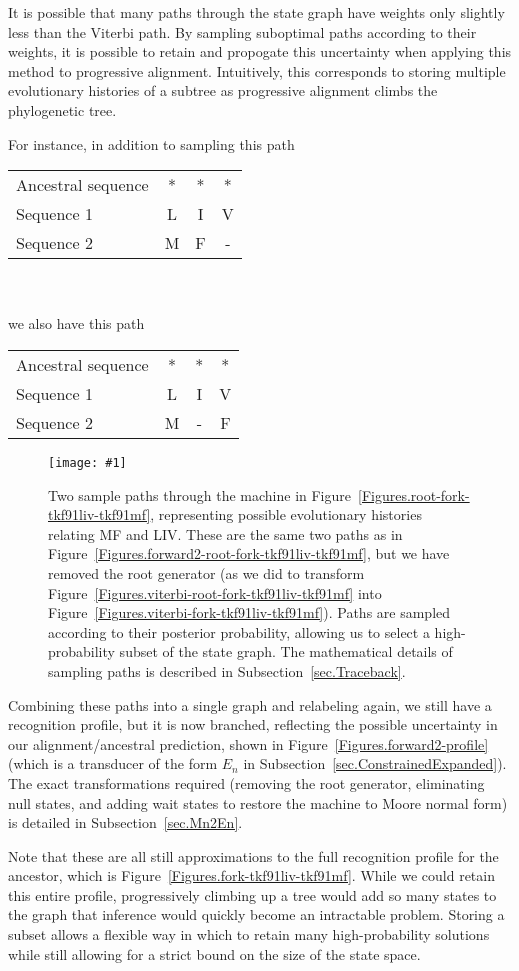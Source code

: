 \documentclass{article}
\newcommand{\secref}[1]{Subsection~\ref{sec.#1}}
\newcommand{\figref}[1]{Figure~\ref{Figures.#1}}
\newcommand{\figlabel}[1]{\label{Figures.#1}}
\newcommand{\easyfig}[4]{
\begin{figure}
\texttt{[image: \#1]}
\caption{ \figlabel{#3} #4}
\end{figure}}
\newcommand{\widepdffig}[2]{\easyfig{#1-fig.pdf}{width=\textwidth}{#1}{#2}}
\begin{document}
It is possible that many paths through the state graph have weights only slightly less than the 
Viterbi path.
By sampling suboptimal paths according to their weights, it is possible to retain and 
propogate  this uncertainty when applying this method to progressive alignment. 
Intuitively, this corresponds to storing multiple evolutionary histories of a subtree
as  progressive alignment climbs the phylogenetic tree.  

\noindent For instance, in addition to sampling this path

\begin{tabular}{lccc}
Ancestral sequence & * & * & * \\
Sequence 1         & L & I & V \\
Sequence 2         & M & F & -
\end{tabular}
\\ \\ 
we also have this path

\begin{tabular}{lccc}
Ancestral sequence & * & * & * \\
Sequence 1         & L & I & V \\
Sequence 2         & M & - & F
\end{tabular}

\widepdffig{forward2-fork-tkf91liv-tkf91mf}{Two sample paths through the 
machine in \figref{root-fork-tkf91liv-tkf91mf}, representing
possible evolutionary histories relating MF and LIV.
These are the same two paths as in \figref{forward2-root-fork-tkf91liv-tkf91mf},
but we have removed the root generator (as we did to transform \figref{viterbi-root-fork-tkf91liv-tkf91mf} into \figref{viterbi-fork-tkf91liv-tkf91mf}).
Paths are sampled according to their posterior probability, 
allowing us to select a high-probability subset of the state graph.  
The mathematical details of sampling paths is described in \secref{Traceback}.}

Combining these paths into a single graph and relabeling again, 
we still have a recognition profile, but it is now branched,
reflecting the possible uncertainty in our alignment/ancestral prediction, shown in \figref{forward2-profile}
(which is a transducer of the form $E_n$ in \secref{ConstrainedExpanded}).
The exact transformations required (removing the root generator, eliminating null states, and adding wait states to restore the machine to Moore normal form)
is detailed in \secref{Mn2En}.  

Note that these are all still approximations to the full
recognition profile for the ancestor, which is \figref{fork-tkf91liv-tkf91mf}.  
While we could retain this entire profile, progressively climbing up a tree
would add so many states to the graph that inference would quickly become an intractable
problem.  
Storing a subset allows a flexible way in which to retain many high-probability solutions
while still allowing for a strict bound on the size of the state space. 
\end{document}
